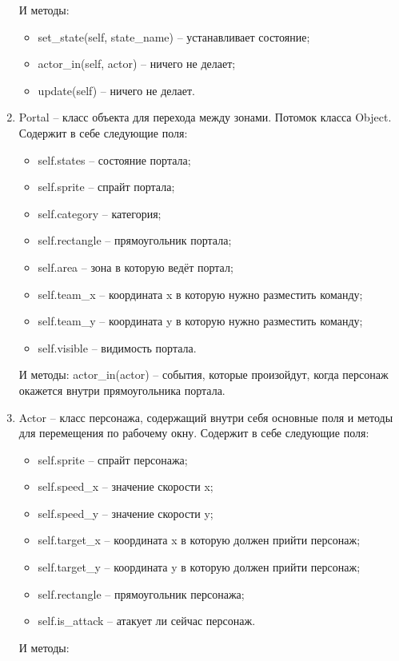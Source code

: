 \begin{enumerate}
\begin{itemize}
		\end{itemize}
		И методы:
		\begin{itemize}
			\item set\_state(self, state\_name) -- устанавливает состояние;
			\item actor\_in(self, actor) -- ничего не делает;
			\item update(self) -- ничего не делает.
		\end{itemize}
	\item Portal -- класс объекта для перехода между зонами. Потомок класса Object. Содержит в себе следующие поля:
		\begin{itemize}
			\item self.states -- состояние портала;
			\item self.sprite -- спрайт портала;
			\item self.category -- категория;
			\item self.rectangle -- прямоугольник портала;
			\item self.area -- зона в которую ведёт портал;
			\item self.team\_x -- координата x в  которую нужно разместить команду;
			\item self.team\_y -- координата y в  которую нужно разместить команду;
			\item self.visible -- видимость портала.
		\end{itemize}
		И методы:
			actor\_in(actor) -- события, которые произойдут, когда персонаж окажется внутри прямоугольника портала.
	\item Actor -- класс персонажа, содержащий внутри себя основные поля и методы для перемещения по рабочему окну. Содержит в себе следующие поля:
		\begin{itemize}
			\item self.sprite -- спрайт персонажа;
			\item self.speed\_x -- значение скорости x;
			\item self.speed\_y -- значение скорости y;
			\item self.target\_x -- координата x в которую должен прийти персонаж;
			\item self.target\_y -- координата y в которую должен прийти персонаж;
			\item self.rectangle -- прямоугольник персонажа;
			\item self.is\_attack -- атакует ли сейчас персонаж.
		\end{itemize}
		И методы:
		\begin{itemize}

\end{itemize}
\end{enumerate}
